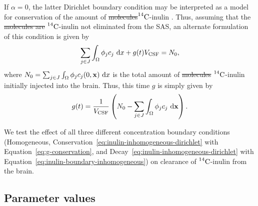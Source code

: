 \documentclass[10pt]{article}
\newcommand{\1}{^{(1)}}
\newcommand{\2}{^{(2)}}
\newcommand*{\dd}{\mathop{\kern0pt\mathrm{d}}\!{}}
\newcommand {\x}   {\mathbf{x}}
\newcommand{\Cinulin}{$\prescript{14}{}{\text{C}}$-inulin }
\newtheorem{remark}[theorem]{Remark}
\providecommand{\DIFaddtex}[1]{{\protect\color{blue}\uwave{#1}}} %
\providecommand{\DIFdeltex}[1]{{\protect\color{red}\sout{#1}}}                      %
\providecommand{\DIFaddbegin}{} %
\providecommand{\DIFaddend}{} %
\providecommand{\DIFdelbegin}{} %
\providecommand{\DIFdelend}{} %
\providecommand{\DIFadd}[1]{\texorpdfstring{\DIFaddtex{#1}}{#1}} %
\providecommand{\DIFdel}[1]{\texorpdfstring{\DIFdeltex{#1}}{}} %
\newcommand{\DIFscaledelfig}{0.5}
\newlength{\DIFdelgraphicswidth} %
\newlength{\DIFdelgraphicsheight} %
\newcommand{\DIFaddincludegraphics}[2][]{{\color{blue}\fbox{\DIFOincludegraphics[#1]{#2}}}} %
\newcommand{\DIFdelincludegraphics}[2][]{%
\sbox{\DIFdelgraphicsbox}{\DIFOincludegraphics[#1]{#2}}%
\settoboxwidth{\DIFdelgraphicswidth}{\DIFdelgraphicsbox} %
\settoboxtotalheight{\DIFdelgraphicsheight}{\DIFdelgraphicsbox} %
\scalebox{\DIFscaledelfig}{%
\parbox[b]{\DIFdelgraphicswidth}{\usebox{\DIFdelgraphicsbox}\\[-\baselineskip] \rule{\DIFdelgraphicswidth}{0em}}\llap{\resizebox{\DIFdelgraphicswidth}{\DIFdelgraphicsheight}{%
\setlength{\unitlength}{\DIFdelgraphicswidth}%
\begin{picture}(1,1)%
\thicklines\linethickness{2pt} %
{\color[rgb]{1,0,0}\put(0,0){\framebox(1,1){}}}%
{\color[rgb]{1,0,0}\put(0,0){\line( 1,1){1}}}%
{\color[rgb]{1,0,0}\put(0,1){\line(1,-1){1}}}%
\end{picture}%
}\hspace*{3pt}}} %
} %
\DeclareRobustCommand{\DIFaddbegin}{\DIFOaddbegin \let\includegraphics\DIFaddincludegraphics} %
\DeclareRobustCommand{\DIFaddend}{\DIFOaddend \let\includegraphics\DIFOincludegraphics} %
\DeclareRobustCommand{\DIFdelbegin}{\DIFOdelbegin \let\includegraphics\DIFdelincludegraphics} %
\DeclareRobustCommand{\DIFdelend}{\DIFOaddend \let\includegraphics\DIFOincludegraphics} %
\begin{document}
If $\alpha = 0$, the latter Dirichlet boundary condition may be interpreted as a model for conservation of the amount of \DIFdelbegin \DIFdel{molecules}\DIFdelend \DIFaddbegin \Cinulin\DIFaddend . Thus, assuming that the \DIFdelbegin \DIFdel{molecules are }\DIFdelend \DIFaddbegin \Cinulin \DIFadd{is }\DIFaddend not eliminated from the SAS, an alternate formulation of this condition is given by
\begin{equation}
    \sum_{j\in J} \int_\Omega  \phi_j c_j \,\dd x + g(t) V_{\text{CSF}} = N_0,
    \label{eq:inulin-tracer-conservation}
\end{equation}
where $N_0 = \sum_{j\in J} \int_\Omega  \phi_j c_j(0,\x) \,\dd x $ is the total amount of \DIFdelbegin \DIFdel{molecules }\DIFdelend \DIFaddbegin \Cinulin \DIFaddend initially injected into the brain. Thus, this time $g$ is simply given by 
\begin{equation}
    g(t) = \frac{1}{ V_{\text{CSF}}}\left( N_0  - \sum_{j\in J} \int_\Omega  \phi_j c_j \,\dd \x \right) .
    \label{eq:g-conservation}
\end{equation}

We test the effect of all three different concentration boundary conditions (Homogeneous, Conservation~\eqref{eq:inulin-inhomogeneous-dirichlet} with Equation~\eqref{eq:g-conservation}, and Decay~\eqref{eq:inulin-inhomogeneous-dirichlet} with Equation~\eqref{eq:inulin-boundary-inhomogeneous}) on clearance of \Cinulin from the brain. 




\subsection{Parameter values}
\label{subsec:para-values}
\end{document}
